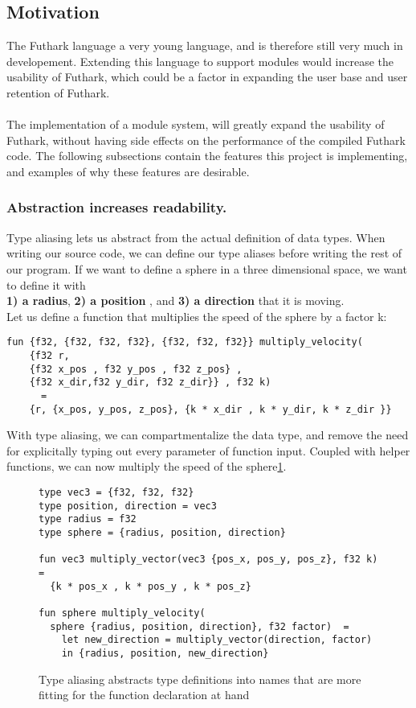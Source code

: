 \pagebreak
\subsection{Motivation}
\label{subsec:label}
The Futhark language a very young language, and is therefore still very much in
developement.
Extending this language to support modules would increase the usability of
Futhark, which could be a factor in expanding the user base and user retention
of Futhark.
\\
\\
The implementation of a module system, will greatly expand the usability of
Futhark, without having side effects on the performance of the compiled Futhark code.
The following subsections contain the features this project is implementing, and
examples of why these features are desirable.
\subsubsection{Abstraction increases readability.} 
Type aliasing lets us abstract from the actual definition of data types.
When writing our source code, we can define our type aliases before writing the
rest of our program.
If we want to define a sphere in a three dimensional space, we want to define it
with \\
\textbf{1) a radius}, \textbf{2) a position} , and \textbf{3) a direction} that it is
moving.\\
Let us define a function that multiplies the speed of the sphere by a factor k:
\begin{lstlisting}
fun {f32, {f32, f32, f32}, {f32, f32, f32}} multiply_velocity(
	{f32 r, 
	{f32 x_pos , f32 y_pos , f32 z_pos} , 
	{f32 x_dir,f32 y_dir, f32 z_dir}} , f32 k) 
	  =
    {r, {x_pos, y_pos, z_pos}, {k * x_dir , k * y_dir, k * z_dir }}
\end{lstlisting}
\noindent
With type aliasing, we can compartmentalize the data type, and remove the need
for explicitally typing out every parameter of function input.
Coupled with helper functions, we can now multiply the speed of the sphere\ref{sphere_example}.
\begin{figure}\label{sphere_example}
\begin{verbatim}
type vec3 = {f32, f32, f32}
type position, direction = vec3 
type radius = f32
type sphere = {radius, position, direction}

fun vec3 multiply_vector(vec3 {pos_x, pos_y, pos_z}, f32 k) =
  {k * pos_x , k * pos_y , k * pos_z}

fun sphere multiply_velocity(
  sphere {radius, position, direction}, f32 factor)  =
    let new_direction = multiply_vector(direction, factor)
    in {radius, position, new_direction}
\end{verbatim}
\caption{Type aliasing abstracts type definitions into names that are more
  fitting for the function declaration at hand}
\end{figure}

